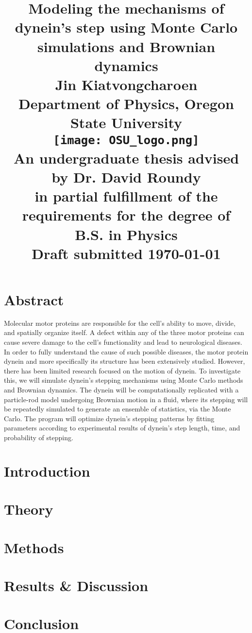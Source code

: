 \documentclass[12pt]{report}
\title{
	\Huge{Modeling the mechanisms of dynein's step using Monte Carlo simulations and Brownian dynamics}\vspace{1em}\\
	\Large{Jin Kiatvongcharoen} \vspace{0.5em}\\ 
	\normalsize{Department of Physics, Oregon State University}\vspace{2em}\\
	\texttt{[image: OSU\_logo.png]}\vspace{1em}\\
	\normalsize{An undergraduate thesis advised by Dr. David Roundy}\\
	\normalsize{in partial fulfillment of the requirements for the degree of}\\
	\normalsize{B.S. in Physics}\vspace{1.5 em}\\
	\normalsize{Draft submitted \today}\\


}
\date{}
\begin{document}
    \maketitle
    \onehalfspacing


	\chapter*{Abstract}
	Molecular motor proteins are responsible for the cell’s ability to move, divide, and spatially organize itself. A defect within any of the three motor proteins can cause severe damage to the cell’s functionality and lead to neurological diseases. In order to fully understand the cause of such possible diseases, the motor protein dynein and more specifically its structure has been extensively studied. However, there has been limited research focused on the motion of dynein. To investigate this, we will simulate dynein’s stepping mechanisms using Monte Carlo methods and Brownian dynamics. The dynein will be computationally replicated with a particle-rod model undergoing Brownian motion in a fluid, where its stepping will be repeatedly simulated to generate an ensemble of statistics, via the Monte Carlo. The program will optimize dynein’s stepping patterns by fitting parameters according to experimental results of dynein’s step length, time, and probability of stepping. 
	
    \begin{spacing}{1.2}
	\tableofcontents
	\listoffigures
	\end{spacing}
	
	
	\chapter{Introduction}
	
	\chapter{Theory}
	
	\chapter{Methods}
	
	\chapter{Results \& Discussion}
	
	\chapter{Conclusion}
	


\newpage
\cite{Burgess2003} \cite{Cianfrocco2015mechanism} \cite{Dewitt2012} \cite{Capek2017, waczak2019drunken}
\cite{GoodsellArt} \cite{eschbach2011cytoplasmic}
\cite{rao2019molecular} \cite{manna2020mechanistic} \cite{desantis2017lis1} 
\cite{elshenawy2020lis1} \cite{ando2020small} \cite{kinoshita2018step} \cite{qiu2012dynein} \cite{muller1973dynamic} \cite{lim2007vorticity} \cite{fehr2008kinesin} \cite{trott2018mathematical}




\end{document}

